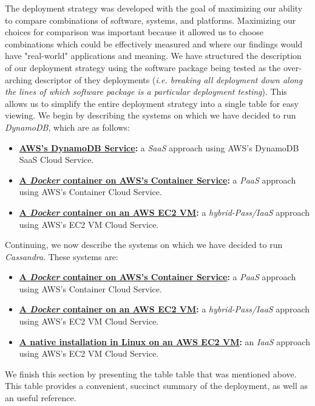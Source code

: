 The deployment strategy was developed with the goal of maximizing our ability to compare combinations of software, systems, and platforms.  Maximizing our choices for comparison was important because it allowed us to choose combinations which could be effectively measured and where our findings would have "real-world" applications and meaning.  We have structured the description of our deployment strategy using the software package being tested as the over-arching descriptor of they deployments (\emph{i.e. breaking all deployment down along the lines of which software package is a particular deployment testing}).  This allows us to simplify the entire deployment strategy into a single table for easy viewing. We begin by describing the systems on which we have decided to run \emph{DynamoDB}, which are as follows:

\begin{itemize}
	\item \textbf{\underline{AWS's DynamoDB Service}:} a \emph{SaaS} approach using AWS's DynamoDB SaaS Cloud Service.
	\item \textbf{\underline{A \emph{Docker} container on AWS's Container Service}:} a \emph{PaaS} approach using AWS's Container Cloud Service.
	\item \textbf{\underline{A \emph{Docker} container on an AWS EC2 VM}:} a \emph{hybrid-Pass/IaaS} approach using AWS's EC2 VM Cloud Service.
\end{itemize}


Continuing, we now describe the systems on which we have decided to run \emph{Cassandra}.  These systems are:

\begin{itemize}
	\item \textbf{\underline{A \emph{Docker} container on AWS's Container Service}:} a \emph{PaaS} approach using AWS's Container Cloud Service.
	\item \textbf{\underline{A \emph{Docker} container on an AWS EC2 VM}:} a \emph{hybrid-Pass/IaaS} approach using AWS's EC2 VM Cloud Service.
	\item \textbf{\underline{A native installation in Linux on an AWS EC2 VM}:} an \emph{IaaS} approach using AWS's EC2 VM Cloud Service.
\end{itemize}


We finish this section by presenting the table table that was mentioned above.  This table provides a convenient, succinct summary of the deployment, as well as an useful reference.

